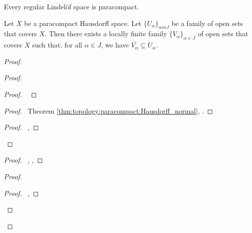 \begin{cor}
Every regular Lindel\"{o}f space is paracompact.
\end{cor}

\begin{lm}
Let $X$ be a paracompact Hausdorff space. Let $\{ U_\alpha \}_{\alpha in J}$ be a family of open sets that covers $X$. Then there exists a locally finite family $\{ V_\alpha \}_{\alpha \in J}$ of open sets that covers $X$ such that, for all $\alpha \in J$, we have $\overline{V_\alpha} \subseteq U_\alpha$.
\end{lm}

\begin{proof}
\pf
{}
\begin{proof}
  \begin{proof}
    \pf\ 
  \end{proof}
  \begin{proof}
    \pf\ Theorem \ref{thm:topology:paracompact:Hausdorff_normal}, .
  \end{proof}
  \begin{proof}
    \pf\ , 
  \end{proof}
\end{proof}
\begin{proof}
  \pf\ , , 
\end{proof}
\begin{proof}
  \begin{proof}
    \pf\ , 
  \end{proof}

\end{proof}
\end{proof}
